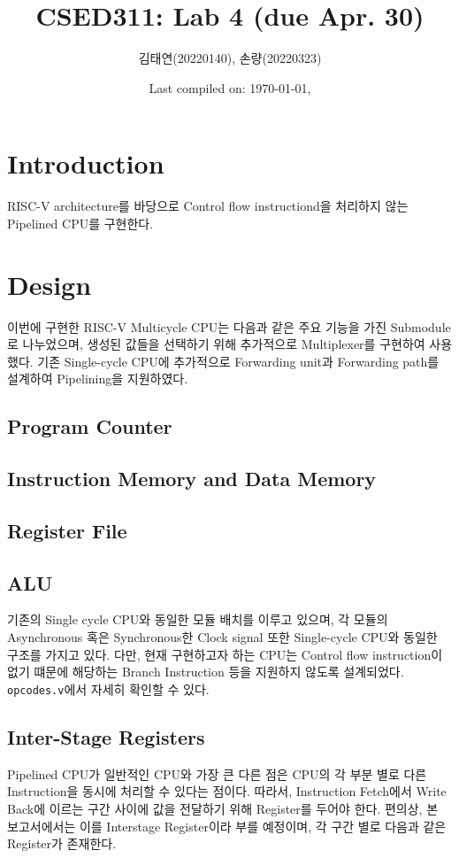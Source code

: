 \documentclass{scrartcl}
\title{CSED311: Lab 4 (due Apr. 30)}
\author{김태연(20220140), 손량(20220323)}
\date{Last compiled on: \today, \currenttime}
\begin{document}
\maketitle

\section{Introduction}
RISC-V architecture를 바당으로 Control flow instructiond을 처리하지 않는 Pipelined CPU를 구현한다.

\section{Design}
이번에 구현한 RISC-V Multicycle CPU는 다음과 같은 주요 기능을 가진 Submodule로 나누었으며, 생성된 값들을 선택하기 위해
추가적으로 Multiplexer를 구현하여 사용했다. 기존 Single-cycle CPU에 추가적으로 Forwarding unit과 Forwarding path를
설계하여 Pipelining을 지원하였다.

\subsection{Program Counter}

\subsection{Instruction Memory and Data Memory}

\subsection{Register File}

\subsection{ALU}

기존의 Single cycle CPU와 동일한 모듈 배치를 이루고 있으며, 각 모듈의 Asynchronous 혹은 Synchronous한 Clock signal
또한 Single-cycle CPU와 동일한 구조를 가지고 있다. 다만, 현재 구현하고자 하는 CPU는 Control flow instruction이 없기 떄문에
해당하는 Branch Instruction 등을 지원하지 않도록 설계되었다. \texttt{opcodes.v}에서 자세히 확인할 수 있다.

\subsection{Inter-Stage Registers}
Pipelined CPU가 일반적인 CPU와 가장 큰 다른 점은 CPU의 각 부분 별로 다른 Instruction을 동시에 처리할 수 있다는 점이다.
따라서, Instruction Fetch에서 Write Back에 이르는 구간 사이에 값을 전달하기 위해 Register를 두어야 한다.
편의상, 본 보고서에서는 이를 Interstage Register이라 부를 예정이며, 각 구간 별로 다음과 같은 Register가 존재한다.
\end{document}
